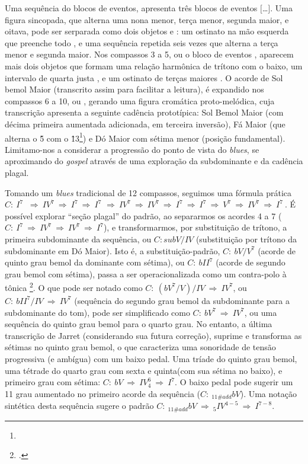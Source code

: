 Uma sequência do blocos de eventos,  apresenta três blocos de eventos $[$\ldots{}$]$. Uma figura sincopada, que alterna uma nona menor, terça menor, segunda maior, e oitava, pode ser serparada como dois objetos  e : um ostinato na mão esquerda que preenche todo , e uma sequência repetida seis vezes que alterna a terça menor e segunda maior. Nos compassos 3 a 5, ou o bloco de eventos , aparecem mais dois objetos que formam uma relação harmônica de trítono com o baixo, um intervalo de quarta justa , e um ostinato de terças maiores . O acorde de Sol bemol Maior (transcrito assim para facilitar a leitura), é expandido nos compassos 6 a 10, ou , gerando uma figura cromática proto-melódica, cuja transcrição apresenta a seguinte cadência prototípica: Sol Bemol Maior (com décima primeira aumentada adicionada, em terceira inversão), Fá Maior (que alterna o \^5 com o \^13\footnote{}) e Dó Maior com sétima menor (posição fundamental). Limitamo-nos a considerar a progressão do ponto de vista do \emph{blues}, se aproximando do \emph{gospel} através de uma exploração da subdominante e da cadência plagal. 

Tomando um \emph{blues} tradicional de 12 compassos, seguimos uma fórmula prática $C:~I^7~$ $\Rightarrow~IV^7~\Rightarrow~I^7~\Rightarrow~I^7$ $\Rightarrow~IV^7~\Rightarrow~IV^7~\Rightarrow~I^7~\Rightarrow~I^7~\Rightarrow~V^7~\Rightarrow~IV^7~\Rightarrow~I^7~$. É possível explorar ``seção plagal'' do padrão, ao separarmos os acordes 4 a 7 ($C:~I^7~\Rightarrow~IV^7~\Rightarrow~IV^7~\Rightarrow~I^7$), e transformarmos, por substituição de trítono, a primeira subdominante da sequência, ou $C: subV/IV$ (substituição por trítono da subdominante em Dó Maior). Isto é, a substituição-padrão, $C:~bV/V^7$ (acorde de quinto grau bemol da dominante com sétima), ou $C:~bII^7$ (acorde de segundo grau bemol com sétima), passa a ser operacionalizada como um contra-polo à tônica \footnote{.}.  O que pode ser notado como $C:~(bV^7/V)/IV~\Rightarrow~IV^7$, ou $C:~bII^7/IV~\Rightarrow~IV^7$ (sequência do segundo grau bemol da subdominante para a subdominante do tom), pode ser simplificado como $C:~bV^7~\Rightarrow~IV^7$, ou uma sequência do quinto grau bemol para o quarto grau.  No entanto, a última transcrição de Jarret (considerando sua futura correção), suprime e transforma as sétimas no quinto grau bemol, o que caracteriza uma sonoridade de tensão progressiva (e ambígua) com um baixo pedal. Uma tríade do quinto grau bemol, uma tétrade do quarto grau com sexta e quinta(com sua sétima no baixo), e primeiro grau com sétima:  $C:~bV~\Rightarrow~IV^6_{4}~\Rightarrow~I^7$. O baixo pedal pode sugerir um 11 grau aumentado no primeiro acorde da sequência ($C:~_{11\#add}bV$). Uma notação sintética desta sequência sugere o padrão  $C:~_{11\#add}bV~\Rightarrow~_{5}IV^{4-5}~\Rightarrow~I^{7-8}$.



